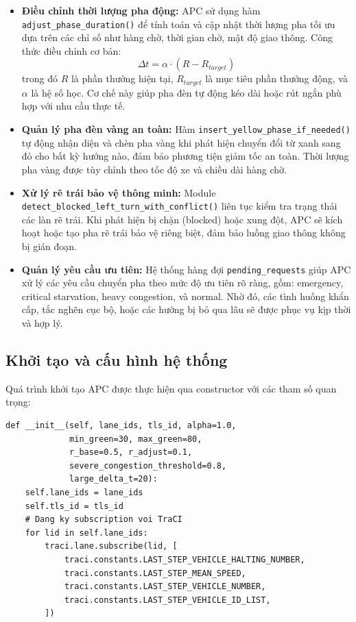 \begin{itemize}
    \item \textbf{Điều chỉnh thời lượng pha động:} APC sử dụng hàm \texttt{adjust\_phase\_duration()} để tính toán và cập nhật thời lượng pha tối ưu dựa trên các chỉ số như hàng chờ, thời gian chờ, mật độ giao thông. Công thức điều chỉnh cơ bản:
    \[
    \Delta t = \alpha \cdot (R - R_{target})
    \]
    trong đó $R$ là phần thưởng hiện tại, $R_{target}$ là mục tiêu phần thưởng động, và $\alpha$ là hệ số học. Cơ chế này giúp pha đèn tự động kéo dài hoặc rút ngắn phù hợp với nhu cầu thực tế.

    \item \textbf{Quản lý pha đèn vàng an toàn:} Hàm \texttt{insert\_yellow\_phase\_if\_needed()} tự động nhận diện và chèn pha vàng khi phát hiện chuyển đổi từ xanh sang đỏ cho bất kỳ hướng nào, đảm bảo phương tiện giảm tốc an toàn. Thời lượng pha vàng được tùy chỉnh theo tốc độ xe và chiều dài hàng chờ.

    \item \textbf{Xử lý rẽ trái bảo vệ thông minh:} Module \texttt{detect\_blocked\_left\_turn\_with\_conflict()} liên tục kiểm tra trạng thái các làn rẽ trái. Khi phát hiện bị chặn (blocked) hoặc xung đột, APC sẽ kích hoạt hoặc tạo pha rẽ trái bảo vệ riêng biệt, đảm bảo luồng giao thông không bị gián đoạn.

    \item \textbf{Quản lý yêu cầu ưu tiên:} Hệ thống hàng đợi \texttt{pending\_requests} giúp APC xử lý các yêu cầu chuyển pha theo mức độ ưu tiên rõ ràng, gồm: emergency, critical starvation, heavy congestion, và normal. Nhờ đó, các tình huống khẩn cấp, tắc nghẽn cục bộ, hoặc các hướng bị bỏ qua lâu sẽ được phục vụ kịp thời và hợp lý.
\end{itemize}
\subsection{Khởi tạo và cấu hình hệ thống}

Quá trình khởi tạo APC được thực hiện qua constructor với các tham số quan trọng:

\begin{lstlisting}[style=py, caption={Khởi tạo AdaptivePhaseController}]
def __init__(self, lane_ids, tls_id, alpha=1.0, 
             min_green=30, max_green=80,
             r_base=0.5, r_adjust=0.1, 
             severe_congestion_threshold=0.8,
             large_delta_t=20):
    self.lane_ids = lane_ids
    self.tls_id = tls_id
    # Dang ky subscription voi TraCI
    for lid in self.lane_ids:
        traci.lane.subscribe(lid, [
            traci.constants.LAST_STEP_VEHICLE_HALTING_NUMBER,
            traci.constants.LAST_STEP_MEAN_SPEED,
            traci.constants.LAST_STEP_VEHICLE_NUMBER,
            traci.constants.LAST_STEP_VEHICLE_ID_LIST,
        ])
\end{lstlisting}

